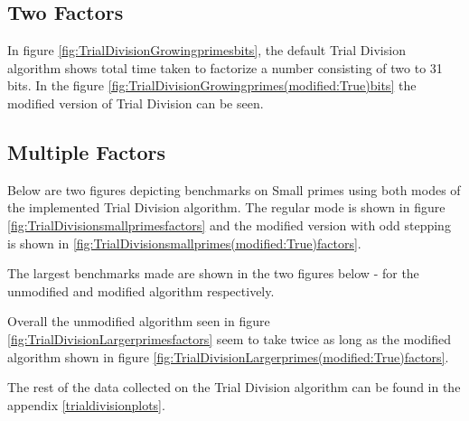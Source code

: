 \subsection{Two Factors}

In figure \ref{fig:TrialDivisionGrowingprimesbits}, the default Trial Division algorithm shows total time taken to factorize a number consisting of two to 31 bits. In the figure \ref{fig:TrialDivisionGrowingprimes(modified:True)bits} the modified version of Trial Division can be seen.





\subsection{Multiple Factors}\label{PollardsMultipleFactors}

Below are two figures depicting benchmarks on Small primes using both modes of the implemented Trial Division algorithm. The regular mode is shown in figure \ref{fig:TrialDivisionsmallprimesfactors} and the modified version with odd stepping is shown in \ref{fig:TrialDivisionsmallprimes(modified:True)factors}.





The largest benchmarks made are shown in the two figures below - for the unmodified and modified algorithm respectively.





Overall the unmodified algorithm seen in figure \ref{fig:TrialDivisionLargerprimesfactors} seem to take twice as long as the modified algorithm shown in figure \ref{fig:TrialDivisionLargerprimes(modified:True)factors}.

The rest of the data collected on the Trial Division algorithm can be found in the appendix \ref{trialdivisionplots}.